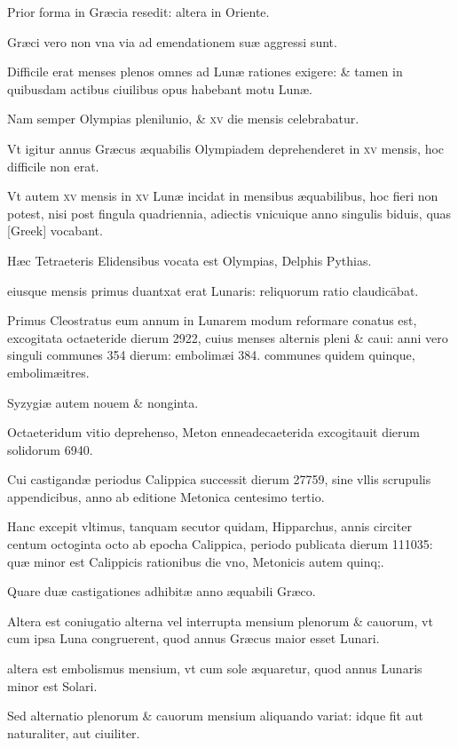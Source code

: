 Prior forma in Græcia resedit: altera in Oriente.

Græci vero non vna via ad emendationem
suæ aggressi sunt.

Difficile erat menses plenos omnes ad
Lunæ rationes exigere: \& tamen in quibusdam actibus ciuilibus opus
habebant motu Lunæ.

Nam semper Olympias plenilunio, \& \textsc{xv}
die mensis celebrabatur.

Vt igitur annus Græcus æquabilis Olympiadem
deprehenderet in \textsc{xv} mensis, hoc difficile non erat.

Vt autem
\textsc{xv} mensis in \textsc{xv}
 Lunæ incidat in mensibus æquabilibus, hoc fieri non
potest, nisi post fingula quadriennia, adiectis vnicuique anno singulis
biduis, quas \textgreek{[Greek]} vocabant.

Hæc Tetraeteris Elidensibus
vocata est Olympias, Delphis Pythias.

eiusque mensis primus duantxat
erat Lunaris: reliquorum ratio claudicābat.

Primus Cleostratus
eum annum in Lunarem modum reformare conatus est, excogitata
octaeteride dierum 2922, cuius menses alternis pleni \& caui: anni vero
singuli communes 354 dierum: embolimæi 384. communes quidem
quinque, embolimæitres.

Syzygiæ autem nouem \& nonginta.

Octaeteridum
vitio deprehenso, Meton enneadecaeterida excogitauit dierum
solidorum 6940.

Cui castigandæ periodus Calippica successit dierum
27759, sine vllis scrupulis appendicibus, anno ab editione Metonica
centesimo tertio.

Hanc excepit vltimus, tanquam secutor quidam,
Hipparchus, annis circiter centum octoginta octo ab epocha Calippica,
periodo publicata dierum 111035: quæ minor est Calippicis rationibus
die vno, Metonicis autem quinq;.

Quare duæ castigationes adhibitæ
anno æquabili Græco.

Altera est coniugatio alterna vel interrupta
mensium plenorum \& cauorum, vt cum ipsa Luna congruerent, quod
annus Græcus maior esset Lunari.

altera est embolismus mensium, vt
cum sole æquaretur, quod annus Lunaris minor est Solari.

Sed alternatio
plenorum \& cauorum mensium aliquando variat: idque fit aut
naturaliter, aut ciuiliter.



